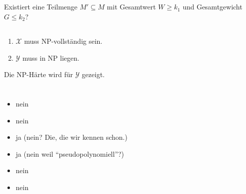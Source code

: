 \documentclass{article}
\begin{document}
\subsection{}%
Existiert eine Teilmenge $M'\subseteq M$ mit Gesamtwert $W \geq k_1$ und Gesamtgewicht $G \leq k_2$?

\subsection{}%
\begin{enumerate}
	\item $\mathcal{X}$ muss NP-vollständig sein.
  \item $\mathcal{Y}$ muss in NP liegen.
\end{enumerate}
Die NP-Härte wird für $\mathcal{Y}$ gezeigt.

\section{}%
\begin{itemize}
	\item nein
  \item nein
  \item ja (nein? Die, die wir kennen schon.)
  \item ja (nein weil "`pseudopolynomiell"'?)
  \item nein
  \item nein
\end{itemize}
\end{document}
